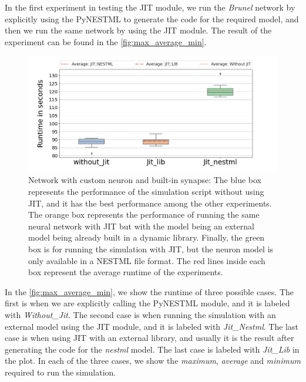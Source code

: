 In the first experiment in testing the JIT module, we run the \emph{Brunel} network by explicitly using the PyNESTML to generate the code for the required model, and then we run the same network by using the JIT module. The result of the experiment can be found in the \autoref{fig:max_average_min}.

\begin{figure}[ht!]
    \centering
    \includegraphics[width=\textwidth]{src/pic/box_plot_three.png}
    \caption{Network with custom neuron and built-in synapse: The blue box represents the performance of the simulation script without using JIT, and it has the best performance among the other experiments. The orange box represents the performance of running the same neural network with JIT but with the model being an external model being already built in a dynamic library. Finally, the green box is for running the simulation with JIT, but the neuron model is only available in a NESTML file format. The red lines inside each box represent the average runtime of the experiments.}
    \label{fig:max_average_min}
\end{figure}

In the \autoref{fig:max_average_min}, we show the runtime of three possible cases. The first is when we are explicitly calling the PyNESTML module, and it is labeled with \emph{Without\_Jit}. The second case is when running the simulation with an external model using the JIT module, and it is labeled with \emph{Jit\_Nestml}. The last case is when using JIT with an external library, and usually it is the result after generating the code for the \emph{nestml} model. The last case is labeled with \emph{Jit\_Lib} in the plot. In each of the three cases, we show the \emph{maximum}, \emph{average} and \emph{minimum} required to run the simulation.

